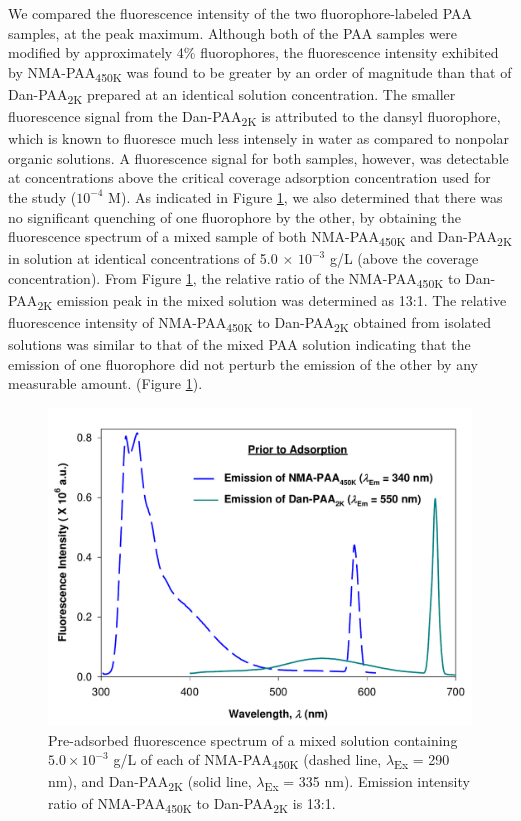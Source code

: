 \documentclass[twoside,twocolumn,9pt]{article}
\begin{document}
We compared the fluorescence intensity of the two fluorophore-labeled PAA samples, at the peak maximum.  Although both of the PAA samples were modified by approximately 4\% fluorophores, the fluorescence intensity exhibited by NMA-PAA\textsubscript{450K} was found to be greater by an order of magnitude than that of Dan-PAA\textsubscript{2K} prepared at an identical solution concentration.  The smaller fluorescence signal from the Dan-PAA\textsubscript{2K} is attributed to the dansyl fluorophore, which is known to fluoresce much less intensely in water as compared to nonpolar organic solutions.\cite{weber1954fluorescent,Bednar1985,Chen1983}  A fluorescence signal for both samples, however, was detectable at concentrations above the critical coverage adsorption concentration used for the study ($10^{-4}$ M).  As indicated in Figure \ref{figure 3}, we also determined that there was no significant quenching of one fluorophore by the other, by obtaining the fluorescence spectrum of a mixed sample of both NMA-PAA\textsubscript{450K} and Dan-PAA\textsubscript{2K} in solution at identical concentrations of 5.0 $\times$ $10^{-3}$ g/L (above the coverage concentration).  From Figure \ref{figure 3}, the relative ratio of the NMA-PAA\textsubscript{450K} to Dan-PAA\textsubscript{2K} emission peak in the mixed solution was determined as 13:1.  The relative fluorescence intensity of NMA-PAA\textsubscript{450K} to Dan-PAA\textsubscript{2K} obtained from isolated solutions was similar to that of the mixed PAA solution indicating that the emission of one fluorophore did not perturb the emission of the other by any measurable amount. (Figure \ref{figure 3}).

\begin{figure}[h]
\includegraphics[scale=0.35]{Figure5.pdf}
\caption{Pre-adsorbed fluorescence spectrum of a mixed solution containing $5.0 \times 10^{-3}$ g/L of each of NMA-PAA\textsubscript{450K} (dashed line, $\lambda$\textsubscript{Ex} = 290 nm), and Dan-PAA\textsubscript{2K} (solid line, $\lambda$\textsubscript{Ex} = 335 nm).  Emission intensity ratio of NMA-PAA\textsubscript{450K} to Dan-PAA\textsubscript{2K}  is 13:1.}
\label{figure 3}
\end{figure}
\end{document}
